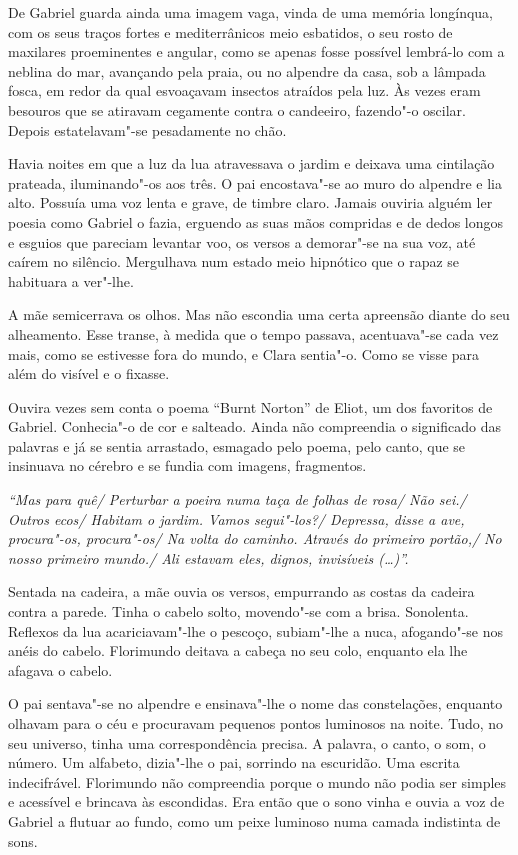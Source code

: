 De Gabriel guarda ainda uma imagem vaga, vinda de uma memória longínqua,
com os seus traços fortes e mediterrânicos meio esbatidos, o seu rosto
de maxilares proeminentes e angular, como se apenas fosse possível
lembrá-lo com a neblina do mar, avançando pela praia, ou no alpendre da
casa, sob a lâmpada fosca, em redor da qual esvoaçavam insectos atraídos
pela luz. Às vezes eram besouros que se atiravam cegamente contra o
candeeiro, fazendo"-o oscilar. Depois estatelavam"-se pesadamente no chão.

Havia noites em que a luz da lua atravessava o jardim e deixava uma
cintilação prateada, iluminando"-os aos três. O pai encostava"-se ao muro
do alpendre e lia alto. Possuía uma voz lenta e grave, de timbre claro.
Jamais ouviria alguém ler poesia como Gabriel o fazia, erguendo as suas
mãos compridas e de dedos longos e esguios que pareciam levantar voo, os
versos a demorar"-se na sua voz, até caírem no silêncio. Mergulhava num
estado meio hipnótico que o rapaz se habituara a ver"-lhe.

A mãe semicerrava os olhos. Mas não escondia uma certa apreensão diante
do seu alheamento. Esse transe, à medida que o tempo passava,
acentuava"-se cada vez mais, como se estivesse fora do mundo, e Clara
sentia"-o. Como se visse para além do visível e o fixasse.

Ouvira vezes sem conta o poema ``Burnt Norton'' de Eliot, um dos
favoritos de Gabriel. Conhecia"-o de cor e salteado. Ainda não
compreendia o significado das palavras e já se sentia arrastado,
esmagado pelo poema, pelo canto, que se insinuava no cérebro e se fundia
com imagens, fragmentos.

\emph{``Mas para quê/ Perturbar a poeira numa taça de folhas de rosa/
Não sei./ Outros ecos/ Habitam o jardim. Vamos segui"-los?/ Depressa,
disse a ave, procura"-os, procura"-os/ Na volta do caminho. Através do
primeiro portão,/ No nosso primeiro mundo./ Ali estavam eles, dignos,
invisíveis (\ldots{})''.}

Sentada na cadeira, a mãe ouvia os versos, empurrando as costas da
cadeira contra a parede. Tinha o cabelo solto, movendo"-se com a brisa.
Sonolenta. Reflexos da lua acariciavam"-lhe o pescoço, subiam"-lhe a nuca,
afogando"-se nos anéis do cabelo. Florimundo deitava a cabeça no seu
colo, enquanto ela lhe afagava o cabelo.

O pai sentava"-se no alpendre e ensinava"-lhe o nome das constelações,
enquanto olhavam para o céu e procuravam pequenos pontos luminosos na
noite. Tudo, no seu universo, tinha uma correspondência precisa. A
palavra, o canto, o som, o número. Um alfabeto, dizia"-lhe o pai,
sorrindo na escuridão. Uma escrita indecifrável. Florimundo não
compreendia porque o mundo não podia ser simples e acessível e brincava
às escondidas. Era então que o sono vinha e ouvia a voz de Gabriel a
flutuar ao fundo, como um peixe luminoso numa camada indistinta de sons.


